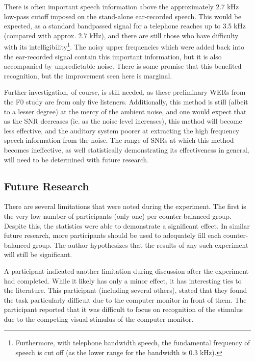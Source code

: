 There is often important speech information above the approximately 2.7 kHz low-pass cutoff imposed on the stand-alone ear-recorded speech.  This would be expected, as a standard bandpassed signal for a telephone reaches up to 3.5 kHz (compared with approx. 2.7 kHz), and there are still those who have difficulty with its intelligibility\footnote{Furthermore, with telephone bandwidth speech, the fundamental frequency of speech is cut off (as the lower range for the bandwidth is 0.3 kHz).}.  The noisy upper frequencies which were added back into the ear-recorded signal contain this important information, but it is also accompanied by unpredictable noise.  There is some promise that this benefited recognition, but the improvement seen here is marginal.

Further investigation, of course, is still needed, as these preliminary WERs from the F0 study are from only five listeners.  Additionally, this method is still (albeit to a lesser degree) at the mercy of the ambient noise, and one would expect that as the SNR decreases (ie. as the noise level increases), this method will become less effective, and the auditory system poorer at extracting the high frequency speech information from the noise.  The range of SNRs at which this method becomes ineffective, as well statistically demonstrating its effectiveness in general, will need to be determined with future research.

\subsection{Future Research}\label{chap3:future-research}

There are several limitations that were noted during the experiment.  The first is the very low number of participants (only one) per counter-balanced group.  Despite this, the statistics were able to demonstrate a significant effect.  In similar future research, more participants should be used to adequately fill each counter-balanced group.  The author hypothesizes that the results of any such experiment will still be significant.  

A participant indicated another limitation during discussion after the experiment had completed.  While it likely has only a minor effect, it has interesting ties to the literature.  This participant (including several others), stated that they found the task particularly difficult due to the computer monitor in front of them.  The participant reported that it was difficult to focus on recognition of the stimulus due to the competing visual stimulus of the computer monitor.

